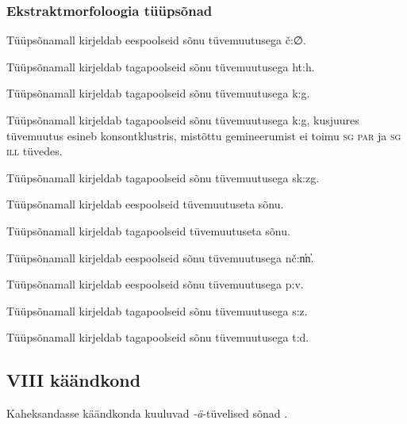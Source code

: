 \documentclass[12pt,a4paper]{article}
\newcommand{\vadja}[1]{\textit{#1}}
\newcommand{\msd}[1]{\textsc{#1}}
\begin{document}
\subsubsection*{Ekstraktmorfoloogia tüüpsõnad}
\vspace{-3.5em}

Tüüpsõna\-mall kirjeldab eespoolseid sõnu tüvemuutusega č:∅.

Tüüpsõna\-mall kirjeldab tagapoolseid sõnu tüvemuutusega ht:h.

Tüüpsõna\-mall kirjeldab tagapoolseid sõnu tüvemuutusega k:g.

Tüüpsõna\-mall kirjeldab tagapoolseid sõnu tüvemuutusega k:g, kusjuures tüvemuutus esineb konsont\-klustris, mistõttu gemineerumist ei toimu \msd{sg par} ja \msd{sg ill} tüvedes.

Tüüpsõna\-mall kirjeldab tagapoolseid sõnu tüvemuutusega sk:zg.

Tüüpsõna\-mall kirjeldab eespoolseid tüvemuutuseta sõnu.

Tüüpsõna\-mall kirjeldab tagapoolseid tüvemuutuseta sõnu.

Tüüpsõna\-mall kirjeldab eespoolseid sõnu tüvemuutusega nč:n̕n̕.

Tüüpsõna\-mall kirjeldab eespoolseid sõnu tüvemuutusega p:v.

Tüüpsõna\-mall kirjeldab tagapoolseid sõnu tüvemuutusega s:z.

Tüüpsõna\-mall kirjeldab tagapoolseid sõnu tüvemuutusega t:d.


\subsection{\RN{8} käändkond}

Kaheksandasse käändkonda kuuluvad \vadja{-ä}-tüvelised sõnad \cite[46]{ariste_grammar_1968}.

\end{document}
